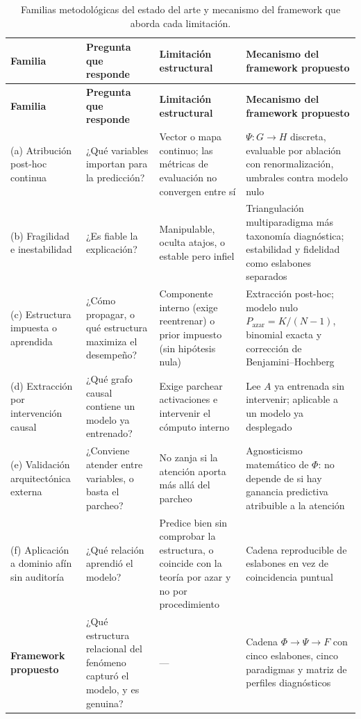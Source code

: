 {\small
\begin{longtable}{P{0.18}P{0.21}P{0.25}P{0.36}}
\caption{Familias metodológicas del estado del arte y mecanismo del framework que aborda cada limitación.}\label{tab:familias}\\
\toprule
\textbf{Familia} & \textbf{Pregunta que responde} & \textbf{Limitación estructural} & \textbf{Mecanismo del framework propuesto}\\
\midrule
\endfirsthead
\toprule
\textbf{Familia} & \textbf{Pregunta que responde} & \textbf{Limitación estructural} & \textbf{Mecanismo del framework propuesto}\\
\midrule
\endhead
(a) Atribución post-hoc continua & ¿Qué variables importan para la predicción? & Vector o mapa continuo; las métricas de evaluación no convergen entre sí & $\Psi: G\to H$ discreta, evaluable por ablación con renormalización, umbrales contra modelo nulo\\
(b) Fragilidad e inestabilidad & ¿Es fiable la explicación? & Manipulable, oculta atajos, o estable pero infiel & Triangulación multiparadigma más taxonomía diagnóstica; estabilidad y fidelidad como eslabones separados\\
(c) Estructura impuesta o aprendida & ¿Cómo propagar, o qué estructura maximiza el desempeño? & Componente interno (exige reentrenar) o prior impuesto (sin hipótesis nula) & Extracción post-hoc; modelo nulo $P_{\text{azar}}=K/(N-1)$, binomial exacta y corrección de Benjamini--Hochberg\\
(d) Extracción por intervención causal & ¿Qué grafo causal contiene un modelo ya entrenado? & Exige parchear activaciones e intervenir el cómputo interno & Lee $A$ ya entrenada sin intervenir; aplicable a un modelo ya desplegado\\
(e) Validación arquitectónica externa & ¿Conviene atender entre variables, o basta el parcheo? & No zanja si la atención aporta más allá del parcheo & Agnosticismo matemático de $\Phi$: no depende de si hay ganancia predictiva atribuible a la atención\\
(f) Aplicación a dominio afín sin auditoría & ¿Qué relación aprendió el modelo? & Predice bien sin comprobar la estructura, o coincide con la teoría por azar y no por procedimiento & Cadena reproducible de eslabones en vez de coincidencia puntual\\
\textbf{Framework propuesto} & ¿Qué estructura relacional del fenómeno capturó el modelo, y es genuina? & --- & Cadena $\Phi\to\Psi\to F$ con cinco eslabones, cinco paradigmas y matriz de perfiles diagnósticos\\
\bottomrule
\end{longtable}
}
